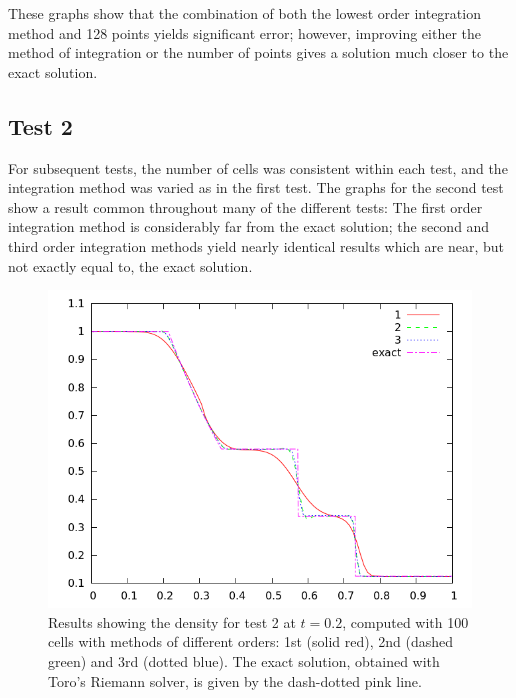 \documentclass[10pt]{article}
\begin{document}
These graphs show that the combination of both the lowest order integration method and 128 points yields significant error; however, improving either the method of integration or the number of points gives a solution much closer to the exact solution. 

\clearpage

\subsection{Test 2}
For subsequent tests, the number of cells was consistent within each test, and the integration method was varied as in the first test. 
The graphs for the second test show a result common throughout many of the different tests: The first order integration method is considerably far from the exact solution; the second and third order integration methods yield nearly identical results which are near, but not exactly equal to, the exact solution. 
\begin{figure}[h]
  \begin{center}
     \includegraphics[width=.78\textwidth]{den_T2.png}	
  \end{center}
  \caption{Results showing the density for test 2 at $t=0.2$, computed with 100 cells with methods of different orders: 1st (solid red), 2nd (dashed green) and 3rd (dotted blue). The exact solution, obtained with Toro's Riemann solver, is given by the dash-dotted pink line.}
  \label{fig:den_T2}
\end{figure}
\end{document}
